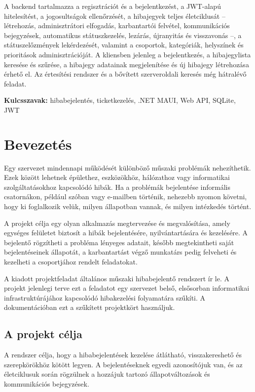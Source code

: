 \documentclass[12pt, a4paper, twoside]{article}
\begin{document}
A backend tartalmazza a regisztrációt és a bejelentkezést, a JWT-alapú hitelesítést, a jogosultságok ellenőrzését, a hibajegyek teljes életciklusát -- létrehozás, adminisztrátori elfogadás, karbantartói felvétel, kommunikációs bejegyzések, automatikus státuszkezelés, lezárás, újranyitás és visszavonás --, a státuszelőzmények lekérdezését, valamint a csoportok, kategóriák, helyszínek és prioritások adminisztrációját. A kliensben jelenleg a bejelentkezés, a hibajegylista keresése és szűrése, a hibajegy adatainak megjelenítése és új hibajegy létrehozása érhető el. Az értesítési rendszer és a bővített szerveroldali keresés még hátralévő feladat.

\textbf{Kulcsszavak:} hibabejelentés, ticketkezelés, .NET MAUI, Web API, SQLite, JWT

\newpage
\tableofcontents

\newpage
{}
\setcounter{page}{1}

\section{Bevezetés}

Egy szervezet mindennapi működését különböző műszaki problémák nehezíthetik. Ezek között lehetnek épülethez, eszközökhöz, hálózathoz vagy informatikai szolgáltatásokhoz kapcsolódó hibák. Ha a problémák bejelentése informális csatornákon, például szóban vagy e-mailben történik, nehezebb nyomon követni, hogy ki foglalkozik velük, milyen állapotban vannak, és milyen intézkedés történt.

A projekt célja egy olyan alkalmazás megtervezése és megvalósítása, amely egységes felületet biztosít a hibák bejelentésére, nyilvántartására és kezelésére. A bejelentő rögzítheti a probléma lényeges adatait, később megtekintheti saját bejelentéseinek állapotát, a karbantartást végző munkatárs pedig felveheti és kezelheti a csoportjához rendelt feladatokat.

A kiadott projektfeladat általános műszaki hibabejelentő rendszert ír le. A projekt jelenlegi terve ezt a feladatot egy szervezet belső, elsősorban informatikai infrastruktúrájához kapcsolódó hibakezelési folyamatára szűkíti. A dokumentációban ezt a szűkített projektkört használjuk.

\subsection{A projekt célja}

A rendszer célja, hogy a hibabejelentések kezelése átlátható, visszakereshető és szerepkörökhöz kötött legyen. A bejelentéseknek egyedi azonosítójuk van, és az életciklusuk során rögzülnek a hozzájuk tartozó állapotváltozások és kommunikációs bejegyzések.
\end{document}
